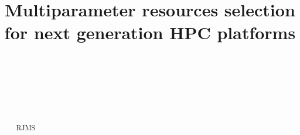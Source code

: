 \documentclass[conference]{IEEEtran}
\begin{document}
%
\title{Multiparameter resources selection for next generation HPC platforms}


\author{
\\
~~~~~~~~~~~~~~~~~~~~~~~~~~~~~~~~~~~~~~~~~
\and
{}
\\
~~~~~~~~~~~~~~~~~~~~~~~~~~~~~~~~~~~~~~~~~~~~

}
\maketitle


\newcommand{\JS}[1]{\textcolor{blue}{[JS: #1]}}
\newcommand{\TI}[1]{\textcolor{red}{[TI: #1]}}
\newcommand{\RS}[1]{\textcolor{cyan}{[RS: #1]}}
\newcommand{\D}[1]{\textcolor{violet}{[DH: #1]}}
\newcommand{\RED}[1]{\textcolor{red}{[ #1]}}
\newcommand{\YG}[1]{\textcolor{orange}{[ #1]}}

\newcommand{\figref}[1]{Figure~\ref{#1}}

\newcommand{\tabref}[1]{Table~\ref{#1}}

\newcommand{\secref}[1]{Section~\ref{#1}}

\newcommand{\todo}[1]{\textbf{\textit{TODO: {#1}}}}

\renewcommand{\bottomfraction}{.5}

\setlength{\itemsep}{-2pt}

\begin{abstract}
RJMS


\end{abstract}

%
\IEEEpeerreviewmaketitle
\end{document}

